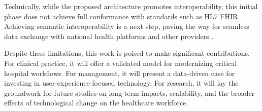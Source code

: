 Technically, while the proposed architecture promotes interoperability, this initial phase does not achieve full conformance with standards such as HL7 FHIR. Achieving semantic interoperability is a next step, paving the way for seamless data exchange with national health platforms and other providers \cite{mandl2020}.

Despite these limitations, this work is poised to make significant contributions. For clinical practice, it will offer a validated model for modernizing critical hospital workflows. For management, it will present a data-driven case for investing in user-experience-focused technology. For research, it will lay the groundwork for future studies on long-term impacts, scalability, and the broader effects of technological change on the healthcare workforce. 